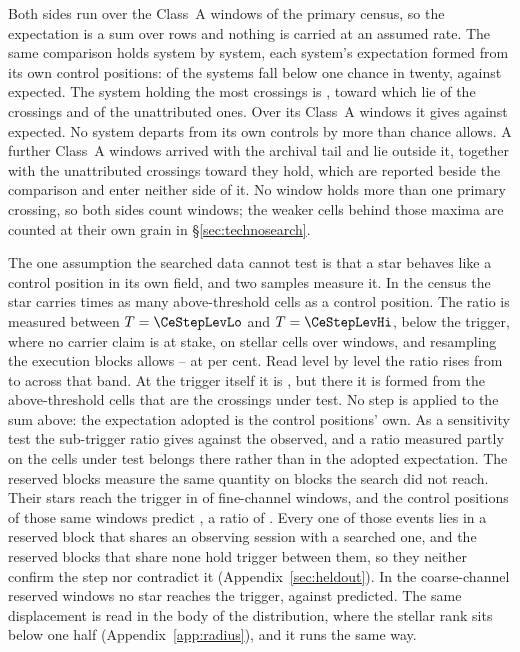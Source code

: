 Both sides run over the \CeNWin{} Class~A windows of the primary census, so
the expectation is a sum over rows and nothing is carried at an assumed rate.
The same comparison holds system by system, each system's expectation formed
from its own control positions: \MtNSysLowP{} of the \MtNSysChance{} systems
fall below one chance in twenty, against \MtNSysLowPExp{} expected. The system
holding the most crossings is \MtTopStar, toward which lie
\MtTopStarNCross{} of the \EvNCrossRaw{} crossings and \MtTopStarNUnattr{} of
the unattributed ones. Over its \MtTopSysNWin{} Class~A windows it gives
\MtTopSysObs{} against \MtTopSysExp{} expected. No system departs from its
own controls by more than chance allows.
A further \CeNWinTail{} Class~A windows arrived with the archival tail and lie
outside it, together with the \CeNTailCrossWord{} unattributed crossings
toward \CeTailStar{} they hold, which are reported beside the comparison and
enter neither side of it. No window holds more than one primary crossing, so
both sides count windows; the weaker cells behind those maxima are counted at
their own grain in \S\ref{sec:technosearch}.

The one assumption the searched data cannot test is that a star behaves like
a control position in its own field, and two samples measure it. In the census
the star carries \CeStep{} times as many above-threshold cells as a control
position. The ratio is measured between $T=\CeStepLevLo$ and
$T=\CeStepLevHi$, below the trigger, where no carrier claim is at stake, on
\CeStepNStar{} stellar cells over \CeStepNWin{} windows, and resampling the
execution blocks allows \CeStepLo--\CeStepHi{} at \CeCovPct{} per cent.
Read level by level the ratio rises from \CkRatioLo{} to \CkRatioHi{}
across that band. At the trigger itself it is \CeTrAt, but there it is formed
from the \CeStepNX{} above-threshold cells that are the crossings under test.
No step is applied to the sum above: the expectation adopted is the control
positions' own. As a sensitivity test the sub-trigger ratio gives \CeExpX{}
against the \CeObs{} observed, and a ratio measured partly on the cells under
test belongs there rather than in the adopted expectation. The reserved blocks measure
the same quantity on blocks the search did not reach. Their stars reach the
trigger in \StHoObs{} of \StHoNFine{} fine-channel windows, and the control
positions of those same windows predict \StHoExpFine, a ratio of
\StHoRatio. Every one of those
events lies in a reserved block that shares an observing session with a
searched one, and the \HsIndBlocks{} reserved blocks that share none hold
\HsIndObsWord{} trigger \HsIndObsNoun{} between them, so they neither confirm
the step nor contradict it (Appendix~\ref{sec:heldout}). In the \StHoNCoarse{} coarse-channel
reserved windows no star reaches the trigger, against \StHoExpCoarse{}
predicted. The same displacement is read in the body of the distribution,
where the stellar rank sits below one half (Appendix~\ref{app:radius}), and it
runs the same way.

